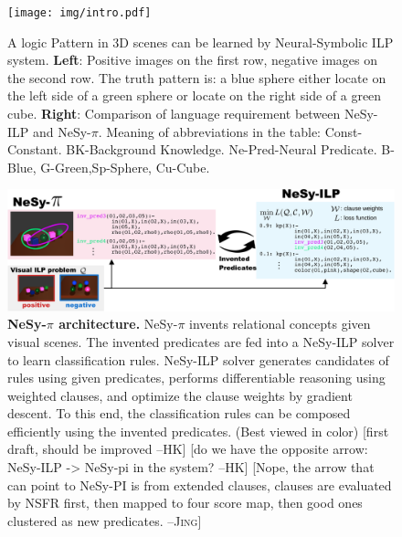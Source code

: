 \documentclass[
]{ceurart}
\newcommand{\js}[1]{\textcolor{OliveGreen}{[#1 \textsc{--Jing}]}}
\newcommand{\hk}[1]{\textcolor{Apricot}{[#1 \textsc{--HK}]}}
\begin{document}
	
	
	
	
	
	\begin{figure}[t]
		\centering
		\texttt{[image: img/intro.pdf]}
		\caption{A logic Pattern in 3D scenes can be learned by Neural-Symbolic ILP system. \textbf{Left}: Positive images on the first row, negative images on the second row. The truth pattern is: a blue sphere either locate on the left side of a green sphere or locate on the right side of a green cube. \textbf{Right}: Comparison of language requirement between NeSy-ILP and NeSy-$ \pi $. Meaning of abbreviations in the table: Const-Constant. BK-Background Knowledge. Ne-Pred-Neural Predicate. B-Blue, G-Green,Sp-Sphere, Cu-Cube. }
		\label{fig:intro}
	\end{figure}
	
	
	
	\begin{figure}
		\centering
		\includegraphics[width=\linewidth]{img/nesypi.pdf}
		\caption{\textbf{NeSy-$\pi$ architecture.} NeSy-$\pi$ invents relational concepts given visual scenes. The invented predicates are fed into a NeSy-ILP solver to learn classification rules. NeSy-ILP solver generates candidates of rules using given predicates, performs differentiable reasoning using weighted clauses, and optimize the clause weights by gradient descent. To this end, the classification rules can be composed efficiently using the invented predicates. (Best viewed in color) \hk{first draft, should be improved} \hk{do we have the opposite arrow: NeSy-ILP -> NeSy-pi in the system?}
			\js{Nope, the arrow that can point to NeSy-PI is from extended clauses, clauses are evaluated by NSFR first, then mapped to four score map, then good ones clustered as new predicates.}
		}
		\label{fig:nesypi}
	\end{figure}
	
\end{document}
